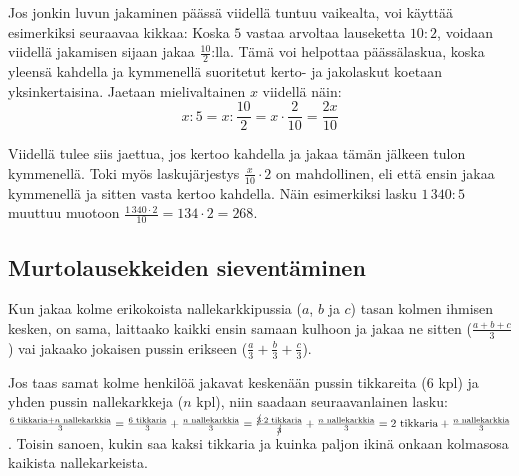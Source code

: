 

\begin{esimerkki}
Jos jonkin luvun jakaminen päässä viidellä tuntuu vaikealta, voi käyttää esimerkiksi seuraavaa kikkaa: Koska $5$ vastaa arvoltaa lauseketta $10:2$, voidaan viidellä jakamisen sijaan jakaa $\frac{10}{2}$:lla. Tämä voi helpottaa päässälaskua, koska yleensä kahdella ja kymmenellä suoritetut kerto- ja jakolaskut koetaan yksinkertaisina. Jaetaan mielivaltainen $x$ viidellä näin:
$$x:5=x:\frac{10}{2}=x\cdot \frac{2}{10}=\frac{2x}{10}$$

Viidellä tulee siis jaettua, jos kertoo kahdella ja jakaa tämän jälkeen tulon kymmenellä. Toki myös laskujärjestys $\frac{x}{10}\cdot 2$ on mahdollinen, eli että ensin jakaa kymmenellä ja sitten vasta kertoo kahdella. Näin esimerkiksi lasku $1\,340:5$ muuttuu muotoon $\frac{1\,340\cdot 2}{10}=134\cdot 2=268$.
\end{esimerkki}

\subsection{Murtolausekkeiden sieventäminen}


\begin{esimerkki}
Kun jakaa kolme erikokoista nallekarkkipussia ($a$, $b$ ja $c$) tasan kolmen ihmisen kesken, on sama, laittaako kaikki ensin samaan kulhoon ja jakaa ne sitten ($\frac{a+b+c}{3}$) vai jakaako jokaisen pussin erikseen ($ \frac{a}{3} + \frac{b}{3} + \frac{c}{3}$).

Jos taas samat kolme henkilöä jakavat keskenään pussin tikkareita ($6$ kpl) ja yhden pussin nallekarkkeja ($n$ kpl), niin saadaan seuraavanlainen lasku: $ \frac{6\text{ tikkaria}+n\text{ nallekarkkia}}{3} = \frac{6\text{ tikkaria}}{3} + \frac{n\text{ nallekarkkia}}{3} = \frac{\cancel{3} \cdot 2\text{ tikkaria}}{\cancel{3}} + \frac{n\text{ nallekarkkia}}{3} = 2\text{ tikkaria} + \frac{n\text{ nallekarkkia}}{3}$. Toisin sanoen, kukin saa kaksi tikkaria ja kuinka paljon ikinä onkaan kolmasosa kaikista nallekarkeista.
\end{esimerkki}

